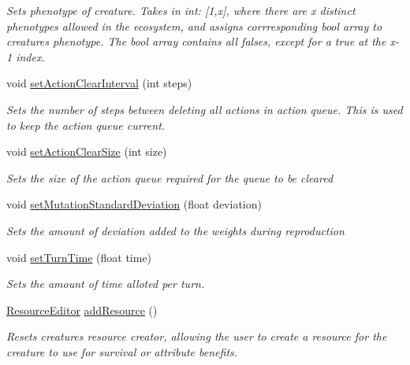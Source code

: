 \begin{DoxyCompactItemize}
\begin{DoxyCompactList}\small\item\em Sets phenotype of creature. Takes in int\+: \mbox{[}1,x\mbox{]}, where there are x distinct phenotypes allowed in the ecosystem, and assigns corrresponding bool array to creatures phenotype. The bool array contains all falses, except for a true at the x-\/1 index. \end{DoxyCompactList}\item 
void \mbox{\hyperlink{class_creature_editor_a1dec102cd9c1c32e2f0639a627203c7f}{set\+Action\+Clear\+Interval}} (int steps)
\begin{DoxyCompactList}\small\item\em Sets the number of steps between deleting all actions in action queue. This is used to keep the action queue current. \end{DoxyCompactList}\item 
void \mbox{\hyperlink{class_creature_editor_a463412404c7ed5f27208b742318f193d}{set\+Action\+Clear\+Size}} (int size)
\begin{DoxyCompactList}\small\item\em Sets the size of the action queue required for the queue to be cleared \end{DoxyCompactList}\item 
void \mbox{\hyperlink{class_creature_editor_aeebb715ee7340999be80095aeb6c5c41}{set\+Mutation\+Standard\+Deviation}} (float deviation)
\begin{DoxyCompactList}\small\item\em Sets the amount of deviation added to the weights during reproduction \end{DoxyCompactList}\item 
void \mbox{\hyperlink{class_creature_editor_a89072895132cbeae88d530bada8c0761}{set\+Turn\+Time}} (float time)
\begin{DoxyCompactList}\small\item\em Sets the amount of time alloted per turn. \end{DoxyCompactList}\item 
\mbox{\hyperlink{class_resource_editor}{Resource\+Editor}} \mbox{\hyperlink{class_creature_editor_a6cd78de22a211b236369afe62ea60c99}{add\+Resource}} ()
\begin{DoxyCompactList}\small\item\em Resets creatures resource creator, allowing the user to create a resource for the creature to use for survival or attribute benefits. \end{DoxyCompactList}\item 

\end{DoxyCompactItemize}

